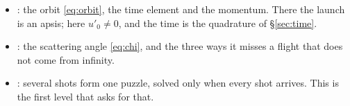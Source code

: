 \documentclass{leveldoc}
\begin{document}
\begin{itemize}
  \item {}: the orbit \eqref{eq:orbit}, the time element and the
    momentum. There the launch is an apsis; here $u'_0 \ne 0$, and the time is the
    quadrature of §\ref{sec:time}.
  \item {}: the scattering angle \eqref{eq:chi}, and the three ways
    it misses a flight that does not come from infinity.
  \item {}: several shots form one puzzle, solved only when
    every shot arrives. This is the first level that asks for that.
\end{itemize}

\levelfileappendix
\end{document}
